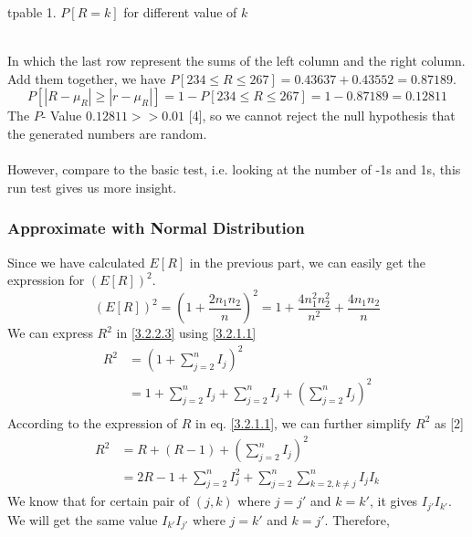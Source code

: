 \documentclass[a4paper,12pt]{article}
\begin{document}
\centerline{tpable 1. $P[R=k]$ for different value of $k$}
\noindent \\In which the last row represent the sums of the left column and the right column. Add them together, we have $P[234\leq R\leq 267] = 0.43637+0.43552 = 0.87189$.
\begin{equation*}
P[|R-\mu _R|\geq |r-\mu_R|]=1-P[234\leq R\leq 267] = 1- 0.87189 = 0.12811
\end{equation*}
The $P$- Value $0.12811>>0.01$ [4], so we cannot reject the null hypothesis that the generated numbers are random.\\\\
However, compare to the basic test, i.e. looking at the number of -1s and 1s, this run test gives us more insight.\\
\subsubsection{Approximate with Normal Distribution}
\noindent Since we have calculated $E[R]$ in the previous part, we can easily get the expression for $(E[R])^2$.\\
\begin{equation}\label{3.2.2.8}
(E[R])^2=(1+\frac{2n_1n_2}{n})^2=1+\frac{4n_1^2 n_2^2}{n^2}+\frac{4n_1n_2}{n}
\end{equation}
We can express $R^2$ in \eqref{3.2.2.3} using \eqref{3.2.1.1}
\begin{equation}\label{3.2.2.3}
\begin{aligned} R ^ { 2 } & = \left( 1 + \sum _ { j = 2 } ^ { n } I _ { j } \right) ^ { 2 } \\ & = 1 + \sum _ { j = 2 } ^ { n } I _ { j } + \sum _ { j = 2 } ^ { n } I _ { j } + \left( \sum _ { j = 2 } ^ {n} I _ { j } \right) ^ { 2 } \\  \end{aligned}
\end{equation}
According to the expression of $R$ in eq. \eqref{3.2.1.1}, we can further simplify $R^2$ as [2]
\begin{equation*}
\begin{aligned}
R^2 & = R + ( R - 1 ) + \left( \sum _ { j = 2 } ^ { n } I _ { j } \right) ^ { 2 } \\ & = 2 R - 1 + \sum _ { j = 2 } ^ { n } I _ { j } ^ { 2 } + \sum _ { j=2} ^ { n } \sum_{k=2,k\neq j}^{n} I _ { j } I _ { k }
\end{aligned}
\end{equation*}
We know that for certain pair of $(j,k)$ where $j=j'$ and $k=k'$, it gives $I_{j'}I_{k'}$. We will get the same value $I_{k'}I_{j'}$ where $j=k'$ and $k=j'$. Therefore,
\end{document}
